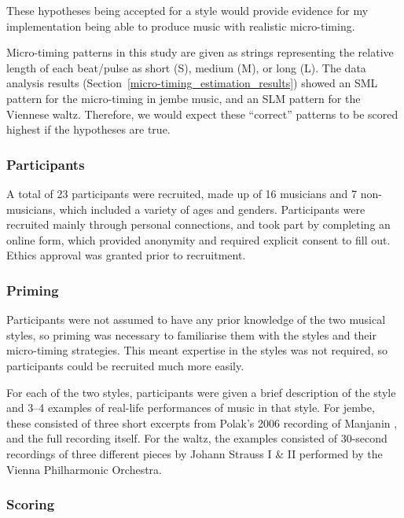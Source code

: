 \documentclass[12pt,twoside,openright]{report}
\begin{document}
These hypotheses being accepted for a style would provide evidence for my
implementation being able to produce music with realistic micro-timing.

Micro-timing patterns in this study are given as strings representing the
relative length of each beat/pulse as short (S), medium (M), or long (L). The
data analysis results (Section~\ref{micro-timing_estimation_results}) showed an SML pattern for the micro-timing in
jembe music, and an SLM pattern for the Viennese waltz. Therefore, we would
expect these ``correct'' patterns to be scored highest if the hypotheses are
true.

\subsubsection{Participants} \label{participants}

A total of 23 participants were recruited, made up of 16 musicians and 7
non-musicians, which included a variety of ages and genders. Participants were
recruited mainly through personal connections, and took part by completing an
online form, which provided anonymity and required explicit consent to fill out.
Ethics approval was granted prior to recruitment.

\subsubsection{Priming} \label{priming}

Participants were not assumed to have any prior knowledge of the two musical
styles, so priming was necessary to familiarise them with the styles and their
micro-timing strategies. This meant expertise in the styles was not required, so
participants could be recruited much more easily.

For each of the two styles, participants were given a brief description of the
style and 3--4 examples of real-life performances of music in that style. For
jembe, these consisted of three short excerpts from Polak's 2006 recording of
Manjanin \cite{polak2010}, and the full recording itself. For the waltz, the examples consisted of
30-second recordings of three different pieces by Johann Strauss I \& II
performed by the Vienna Philharmonic Orchestra.

\subsubsection{Scoring} \label{scoring}
\end{document}
